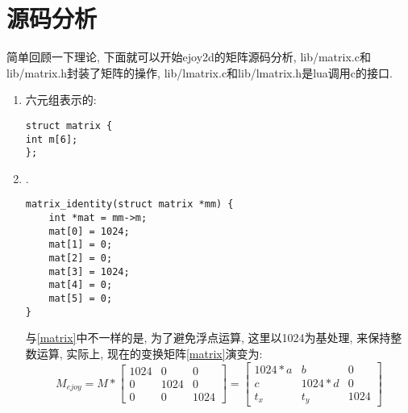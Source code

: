 \section {\Large \ZHH 源码分析} {

    { 简单回顾一下理论, 下面就可以开始ejoy2d的矩阵源码分析, lib/matrix.c和lib/matrix.h封装了矩阵的操作, lib/lmatrix.c和lib/lmatrix.h是lua调用c的接口.}

    \begin {enumerate}

    \gaccobsplitinv

    \item { 六元组表示的{}:
        \begin{lstlisting}[language={[ANSI]C}]
struct matrix {
int m[6];
};
        \end{lstlisting}
    }

    \gaccobsplitinv

    \item { {}.
        \begin{lstlisting}[language={[ANSI]C}]
matrix_identity(struct matrix *mm) {
    int *mat = mm->m;
    mat[0] = 1024;
    mat[1] = 0;
    mat[2] = 0;
    mat[3] = 1024;
    mat[4] = 0;
    mat[5] = 0;
}
        \end{lstlisting}
        与\eqref{matrix}中不一样的是, 为了避免浮点运算, 这里以1024为基处理, 来保持整数运算, 实际上, 现在的变换矩阵\eqref{matrix}演变为:
        \begin{equation}\label{matrix_ejoy2d}
            M_{ejoy} =
            M *
            \begin{bmatrix}
                1024    &   0       &   0\\
                0       &   1024    &   0\\
                0       &   0       &   1024
            \end{bmatrix}
            =
            \begin{bmatrix}
                1024 * a    &   b           & 0 \\
                c           &   1024 * d    & 0 \\
                t_x         &   t_y         & 1024
            \end{bmatrix}
        \end{equation}
    }

    \gaccobsplitinv


\end{enumerate}}
